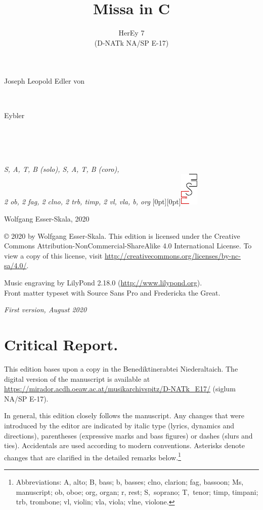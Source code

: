 \documentclass[parskip=full]{scrreprt}
\makeatletter
\DeclareRobustCommand{\sbseries}{\fontseries{sb}\selectfont}
\newcommand\fancytitlehead{
	\headingfont%
	\fontsize{80}{80}\selectfont\textcolor{black!80}{\@ifundefined{@shortname}{\@lastname}{\@shortname}.}\\[15pt]%
	\fontsize{60}{60}\selectfont\@ifundefined{@shorttitle}{\@title}{\@shorttitle}.%
}
\def\firstname#1{\def\@firstname{#1}}
\def\lastname#1{\def\@lastname{#1}}
\def\instrumentation#1{\def\@instrumentation{#1}}
\def\maketitle{%
\begin{titlepage}%
	\Large%
	{\@titlehead}%
	\vfill%
	{\strut\@firstname}\\%
	{\sbseries\color{oldred}\strut\@lastname}\\%
	{\strut\@namesuffix}%
	\vfill%
	{\sbseries\@title}\\%
	{\@subtitle}\\[\baselineskip]%
	{\itshape\@instrumentation}%
	\vfill%
	{\itshape\@parts}\hspace*{\fill}\raisebox{0pt}[0pt][0pt]{\includegraphics{ees_logo}}%
\end{titlepage}%
}
\newif\ifprintreport\printreportfalse
\makeatother
\begin{document}
\frenchspacing

\titlehead{\fancytitlehead}
\firstname{Joseph Leopold Edler von}
\lastname{Eybler}
\title{Missa in C}
\subtitle{HerEy 7\\(D-NATk NA/SP E-17)}
\instrumentation{S, A, T, B (solo), S, A, T, B (coro),\\2 ob, 2 fag, 2 clno, 2 trb, timp, 2 vl, vla, b, org}
\maketitle


\thispagestyle{empty}

\vspace*{\fill}

\hspace*{1em}Wolfgang Esser-Skala, 2020

© 2020 by Wolfgang Esser-Skala. This edition is licensed under the Creative Commons Attribution-NonCommercial-ShareAlike 4.0 International License. To view a copy of this license, visit \url{http://creativecommons.org/licenses/by-nc-sa/4.0/}. 

Music engraving by LilyPond 2.18.0 (\url{http://www.lilypond.org}).\\
Front matter typeset with Source Sans Pro and Fredericka the Great.

\textit{First version, August 2020}

\vspace*{2cm}

\ifprintreport
\chapter*{Critical Report.}

This edition bases upon a copy in the Benediktinerabtei Niederaltaich. The digital version of the manuscript is available at \url{https://mirador.acdh.oeaw.ac.at/musikarchivspitz/D-NATk_E17/} (siglum NA/SP E-17).

In general, this edition closely follows the manuscript. Any changes that were introduced by the editor are indicated by italic type (lyrics, dynamics and directions), parentheses (expressive marks and bass figures) or dashes (slurs and ties). Accidentals are used according to modern conventions. Asterisks denote changes that are clarified in the detailed remarks below.\footnote{Abbreviations: A, alto; B, bass; b, basses; clno, clarion; fag, bassoon; Ms, manuscript; ob, oboe; org, organ; r, rest; S,~soprano; T,~tenor; timp, timpani; trb, trombone; vl, violin; vla, viola; vlne, violone.}
\end{document}
